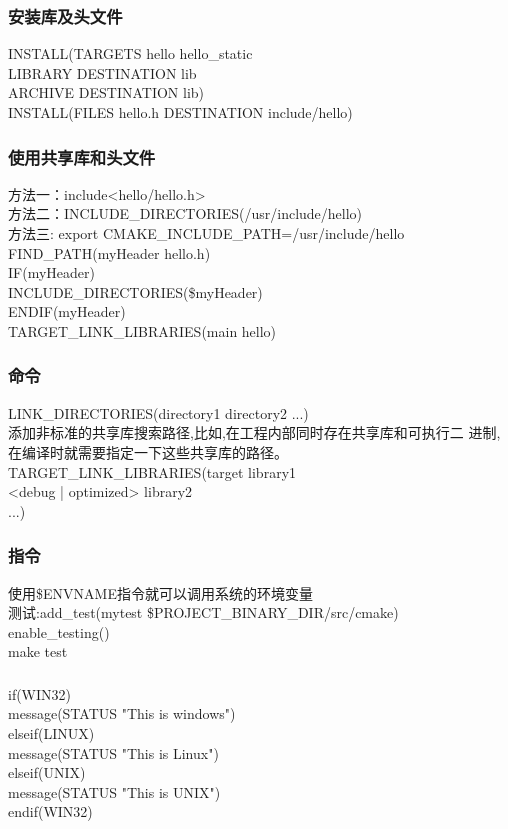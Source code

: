 \documentclass{beamer}
\newcommand{\quotes}[1]{"#1"}
\begin{document}
\begin{CJK}{UTF8}{gkai}
  \begin{frame}\frametitle{安装库及头文件}
    INSTALL(TARGETS hello hello\_static\\
    LIBRARY DESTINATION lib\\
    ARCHIVE DESTINATION lib)\\
    INSTALL(FILES hello.h DESTINATION include/hello)\\
  \end{frame}

  \begin{frame}\frametitle{使用共享库和头文件}
    方法一：include<hello/hello.h>\\
    方法二：INCLUDE\_DIRECTORIES(/usr/include/hello)\\
    方法三: export CMAKE\_INCLUDE\_PATH=/usr/include/hello\\
    FIND\_PATH(myHeader hello.h)\\
    IF(myHeader)\\
    INCLUDE\_DIRECTORIES(\${myHeader})\\
    ENDIF(myHeader)\\
    TARGET\_LINK\_LIBRARIES(main hello)
  \end{frame}

  \begin{frame}\frametitle{命令}
    LINK\_DIRECTORIES(directory1 directory2 ...)\\
    添加非标准的共享库搜索路径,比如,在工程内部同时存在共享库和可执行二
    进制,在编译时就需要指定一下这些共享库的路径。\\
    TARGET\_LINK\_LIBRARIES(target library1\\
    <debug | optimized> library2\\
    ...)\\
  \end{frame}

  \begin{frame}\frametitle{指令}
    使用\$ENV{NAME}指令就可以调用系统的环境变量\\
    测试:add\_test(mytest \${PROJECT\_BINARY\_DIR}/src/cmake)\\
    enable\_testing()\\
    make test\\
  \end{frame}

  \begin{frame}\frametitle{}
    if(WIN32)\\
    message(STATUS \quotes{This is windows})\\
    elseif(LINUX)\\
    message(STATUS \quotes{This is Linux})\\
    elseif(UNIX)\\
    message(STATUS \quotes{This is UNIX})\\
    endif(WIN32)\\
  \end{frame}


\end{CJK}
\end{document}
